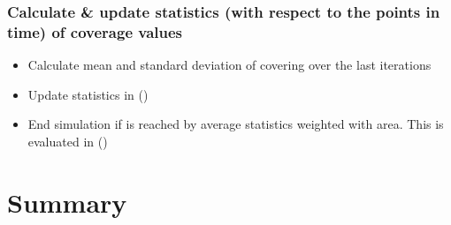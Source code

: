 \subsubsection{Calculate \& update statistics (with respect to the points in time) of coverage values}
\begin{itemize}[noitemsep,topsep=0pt, partopsep=0pt]
\item Calculate mean and standard deviation of covering over the last  iterations
\item Update statistics in  ()
\item End simulation if  is reached by average statistics weighted with area. This is evaluated in  ()
\end{itemize}

\newpage
\section{Summary}
